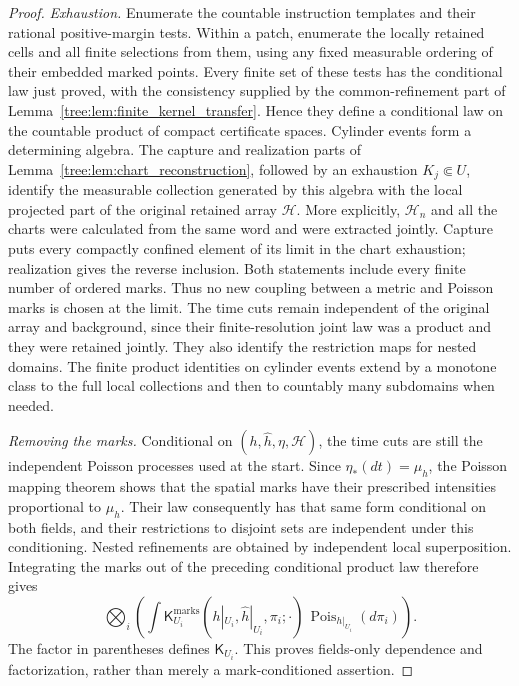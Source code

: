 \begin{proof}
\emph{Exhaustion.}
Enumerate the countable instruction templates and
their rational positive-margin tests.  Within a patch, enumerate the
locally retained cells and all finite selections from them, using any
fixed measurable ordering of their embedded marked points.  Every
finite set of these tests has the conditional law just proved, with
the consistency supplied by the common-refinement part of
Lemma~\ref{tree:lem:finite_kernel_transfer}.  Hence they define a conditional
law on the countable product of compact certificate spaces.  Cylinder
events form a determining algebra.  The capture and realization
parts of Lemma~\ref{tree:lem:chart_reconstruction}, followed by an
exhaustion $K_j\Subset U$, identify the measurable collection generated
by this algebra with the local projected part of the original retained
array $\mathcal H$.  More explicitly, $\mathcal H_n$ and all the
charts were calculated from the same word and were extracted jointly.
Capture puts every compactly confined element of its limit in the
chart exhaustion; realization gives the reverse inclusion.  Both
statements include every finite number of ordered marks.  Thus no
new coupling between a metric and Poisson marks is chosen at the
limit.  The time cuts remain independent of the original array
and background, since their finite-resolution joint law was a
product and they were retained jointly.
They also identify the restriction maps for nested domains.  The
finite product identities on cylinder events extend by a monotone
class to the full local collections and then to countably many
subdomains when needed.

\emph{Removing the marks.}
Conditional on $(h,\widehat h,\eta,\mathcal H)$, the time cuts are still the
independent Poisson processes used at the start.  Since
$\eta_*(dt)=\mu_h$, the Poisson mapping theorem shows that the spatial
marks have their prescribed intensities proportional to $\mu_h$.
Their law consequently has that same form conditional on both fields,
and their restrictions to disjoint sets are independent under this
conditioning.  Nested refinements are obtained by independent
local superposition.  Integrating the marks out of the preceding
conditional product law therefore gives
\[
 \bigotimes_i\left(\int
  \mathsf K_{U_i}^{\mathrm{marks}}(h|_{U_i},\widehat h|_{U_i},\pi_i;\cdot)
     \,\operatorname{Pois}_{h|_{U_i}}(d\pi_i)\right).
\]
The factor in parentheses defines $\mathsf K_{U_i}$.  This proves
fields-only dependence and factorization, rather than merely a
mark-conditioned assertion.


\end{proof}
